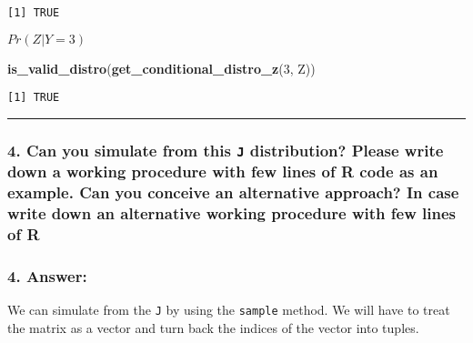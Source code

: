 \documentclass[
]{article}
\newenvironment{Shaded}{\begin{snugshade}}{\end{snugshade}}
\newcommand{\DecValTok}[1]{\textcolor[rgb]{0.00,0.00,0.81}{#1}}
\newcommand{\FunctionTok}[1]{\textcolor[rgb]{0.13,0.29,0.53}{\textbf{#1}}}
\newcommand{\NormalTok}[1]{#1}
\begin{document}
\begin{verbatim}
[1] TRUE
\end{verbatim}

\(Pr(Z | Y=3)\)

\begin{Shaded}
\begin{Highlighting}[]
\FunctionTok{is\_valid\_distro}\NormalTok{(}\FunctionTok{get\_conditional\_distro\_z}\NormalTok{(}\DecValTok{3}\NormalTok{, Z))}
\end{Highlighting}
\end{Shaded}

\begin{verbatim}
[1] TRUE
\end{verbatim}

\begin{center}\rule{0.5\linewidth}{0.5pt}\end{center}

\bigskip

\hypertarget{can-you-simulate-from-this-j-distribution-please-write-down-a-working-procedure-with-few-lines-of-r-code-as-an-example.-can-you-conceive-an-alternative-approach-in-case-write-down-an-alternative-working-procedure-with-few-lines-of-r}{%
\subsubsection{\texorpdfstring{4. Can you simulate from this \texttt{J}
distribution? Please write down a working procedure with few lines of R
code as an example. Can you conceive an alternative approach? In case
write down an alternative working procedure with few lines of
R}{4. Can you simulate from this J distribution? Please write down a working procedure with few lines of R code as an example. Can you conceive an alternative approach? In case write down an alternative working procedure with few lines of R}}\label{can-you-simulate-from-this-j-distribution-please-write-down-a-working-procedure-with-few-lines-of-r-code-as-an-example.-can-you-conceive-an-alternative-approach-in-case-write-down-an-alternative-working-procedure-with-few-lines-of-r}}

\hypertarget{answer-3}{%
\subsubsection{4. Answer:}\label{answer-3}}

We can simulate from the \texttt{J} by using the \texttt{sample} method.
We will have to treat the matrix as a vector and turn back the indices
of the vector into tuples.
\end{document}
